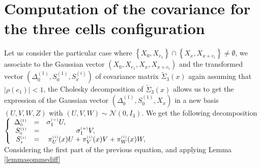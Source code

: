 \documentclass[12pt]{article}
\renewcommand{\tilde}{\widetilde}
\theoremstyle{Theorem}
\begin{document}
\section{Computation of the covariance for the three cells configuration}
Let us consider the particular case where $\left\{ X_{0}, X_{e_1}\right\} \cap \left\{ X_{x}, X_{x+e_i}\right\} \neq \emptyset $,
 we associate to the Gaussian vector $\left(X_{0}, X_{e_1}, X_{x}, X_{x+e_i} \right)$ and the transformed vector $\left(\Delta^{\scriptscriptstyle (1)}_{\scriptscriptstyle 0}, S^{\scriptscriptstyle (1)}_{\scriptscriptstyle 0}, S^{\scriptscriptstyle (i)}_{x} \right)$ of covariance matrix $\tilde{\Sigma}_{3}(x)$ again assuming that $|\rho(e_1)| < 1$, the Cholesky decomposition of $\tilde{\Sigma}_{3}(x)$ allows us to get the expression of the Gaussian vector $\left(\Delta^{\scriptscriptstyle (1)}_{\scriptscriptstyle 0},S^{\scriptscriptstyle (1)}_{\scriptscriptstyle 0},X_{x} \right)$ in a new basis $\left(U,V,W,Z\right)$ with $\left(U, V, W\right) \sim \mathcal{N}\left(0,I_{3}\right)$. We get the following decomposition \\ 
$\left\{
\begin{array}{rlc}
\Delta^{\scriptscriptstyle (1)}_{\scriptscriptstyle 0} & = & \sigma^{\scriptscriptstyle (-)}_{1}U,  \textcolor{white}{+  \pi^{\scriptscriptstyle(+, i)}_{V}(x) V +  \pi^{\scriptscriptstyle(+, i)}_{W}(x) W +  \pi^{\scriptscriptstyle(+, i)}_{Z}(x)Z, } \\
S^{\scriptscriptstyle (1)}_{\scriptscriptstyle 0} & = & \textcolor{white}{\sigma^{\scriptscriptstyle (-)}_{1}U,} \sigma^{\scriptscriptstyle (+)}_{1}V, \textcolor{white}{+  \pi^{\scriptscriptstyle(+, i)}_{W}(x) W +  \pi^{\scriptscriptstyle(+, i)}_{Z}(x)Z, } \\
S^{\scriptscriptstyle (i)}_{\scriptscriptstyle  x} & = &  \pi^{\scriptscriptstyle(i)}_{U}(x)U +  \pi^{\scriptscriptstyle(i)}_{V}(x) V +  \pi^{\scriptscriptstyle(i)}_{W}(x) W, \textcolor{white}{ + \pi^{\scriptscriptstyle(+, i)}_{Z}(x)Z, } \\
\end{array}\right.$ \\
Considering the first part of the previous equation, and applying Lemma \ref{lemmasommediff}
\end{document}
